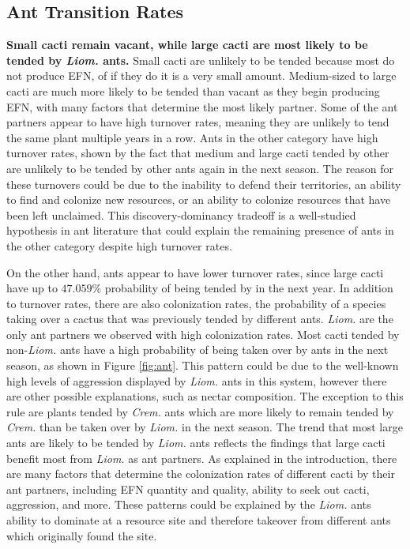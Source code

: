 \documentclass[12pt,a4paper]{article}
\begin{document}
{{\subsection*{Ant Transition Rates}
\textbf{Small cacti remain vacant, while large cacti are most likely to be tended by \textit{Liom.} ants.}
Small cacti are unlikely to be tended because most do not produce EFN, of if they do it is a very small amount. 
Medium-sized to large cacti are much more likely to be tended than vacant as they begin producing EFN, with many factors that determine the most likely partner. 
Some of the ant partners appear to have high turnover rates, meaning they are unlikely to tend the same plant multiple years in a row. 
Ants in the other category have high turnover rates, shown by the fact that medium and large cacti tended by other are unlikely to be tended by other ants again in the next season. 
The reason for these turnovers could be due to the inability to defend their territories, an ability to find and colonize new resources, or an ability to colonize resources that have been left unclaimed. 
This discovery-dominancy tradeoff is a well-studied hypothesis in ant literature \cite{lach2010} that could explain the remaining presence of ants in the other category despite high turnover rates.


On the other hand,  ants appear to have lower turnover rates, since large cacti have up to $47.059\%$ probability of being tended by  in the next year.
In addition to turnover rates, there are also colonization rates, the probability of a species taking over a cactus that was previously tended by different ants. 
\textit{Liom.} are the only ant partners we observed with high colonization rates. 
Most cacti tended by non-\textit{Liom.} ants have a high probability of being taken over by  ants in the next season, as shown in Figure \ref{fig:ant}.
This pattern could be due to the well-known high levels of aggression displayed by \textit{Liom.} ants in this system, however there are other possible explanations, such as nectar composition.
The exception to this rule are plants tended by \textit{Crem.} ants which are more likely to remain tended by \textit{Crem.} than be taken over by \textit{Liom.} in the next season. 
The trend that most large ants are likely to be tended by \textit{Liom.} ants reflects the findings that large cacti benefit most from \textit{Liom.} as ant partners. 
As explained in the introduction, there are many factors that determine the colonization rates of different cacti by their ant partners, including EFN quantity and quality, ability to seek out cacti, aggression, and more.
These patterns could be explained by the \textit{Liom.} ants ability to dominate at a resource site and therefore takeover from different ants which originally found the site. 


}}
\end{document}

